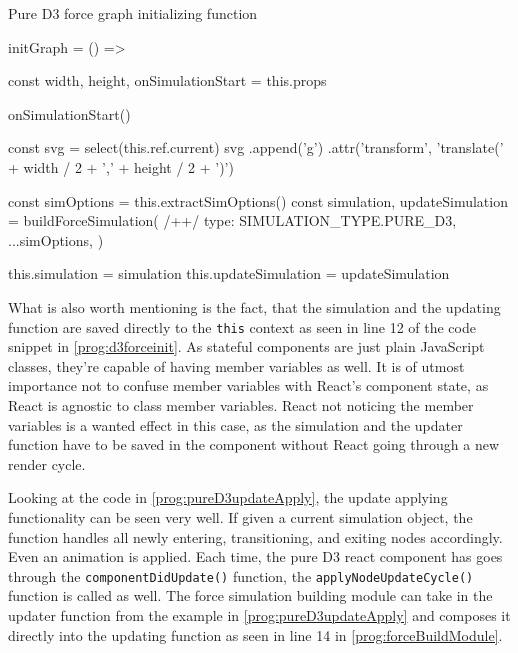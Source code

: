 \begin{program}
\caption{Pure D3 force graph initializing function}
\label{prog:pureD3InitFn}
\begin{JsCode}
initGraph = () => {
  const { width, height, onSimulationStart } = this.props

  onSimulationStart()

  const svg = select(this.ref.current)
  svg
    .append('g')
    .attr('transform', 'translate(' + width / 2 + ',' + height / 2 + ')')

  const simOptions = this.extractSimOptions()
  const { simulation, updateSimulation } = buildForceSimulation({ /+\label{line:buildForceSimulation}+/
    type: SIMULATION_TYPE.PURE_D3,
    ...simOptions,
  })

  this.simulation = simulation
  this.updateSimulation = updateSimulation
}
\end{JsCode}
\end{program}

What is also worth mentioning is the fact, that the simulation and the updating function are saved directly to the \texttt{this} context as seen in line 12 of the code snippet in \ref{prog:d3forceinit}. As stateful components are just plain JavaScript classes, they're capable of having member variables as well. It is of utmost importance not to confuse member variables with React's component state, as React is agnostic to class member variables. React not noticing the member variables is a wanted effect in this case, as the simulation and the updater function have to be saved in the component without React going through a new render cycle. 

Looking at the code in \ref{prog:pureD3updateApply}, the update applying functionality can be seen very well. If given a current simulation object, the function handles all newly entering, transitioning, and exiting nodes accordingly. Even an animation is applied. Each time, the pure D3 react component has goes through the \texttt{componentDidUpdate()} function, the \texttt{applyNodeUpdateCycle()} function is called as well. The force simulation building module can take in the updater function from the example in \ref{prog:pureD3updateApply} and composes it directly into the updating function as seen in line 14 in \ref{prog:forceBuildModule}.

